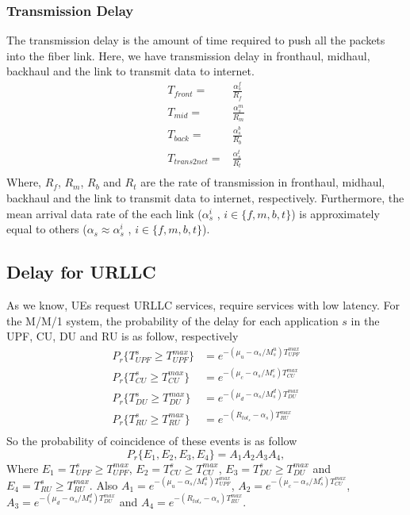 \documentclass[conference]{IEEEtran}
\begin{document}
\subsubsection{Transmission Delay}
The transmission delay is the amount of time required to push all the packets into the fiber link. 
Here, we have transmission delay in fronthaul, midhaul, backhaul and the link to transmit data to internet.
\begin{equation}
\begin{split}
T_{front} =& \frac{\alpha_{s}^{f}}{R_f} \\
T_{mid} =&  \frac{\alpha_{s}^{m}}{R_m} \\
T_{back} =& \frac{\alpha_{s}^{b}}{R_b} \\
T_{trans2net} =& \frac{\alpha_{s}^{t}}{R_t} \\
\end{split}
\end{equation}
Where, $R_f$, $R_m$, $R_b$ and $R_t$ are the rate of transmission in fronthaul, midhaul, backhaul and the link to transmit data to internet, respectively.
Furthermore, the mean arrival data rate of the each link ($\alpha_{s}^i$ , $i \in \{f,m,b,t\}$) is approximately equal to others ($\alpha_{s} \approx \alpha_{s}^i$ , $i \in \{f,m,b,t\}$).  
\subsection{Delay for URLLC}
As we know, UEs request URLLC services, require services with low latency.
For the M/M/1 system, the probability of the delay for each application $s$ in the UPF, CU, DU and RU is as follow, respectively
\begin{equation}
\begin{split}
P_r\{T_{UPF}^{s} \geq T_{UPF}^{max}\} &= e^{-(\mu_u - \alpha_{s}/{M_s^{u}})T_{UPF}^{max}}\\
P_r\{T_{CU}^{s} \geq T_{CU}^{max}\} &= e^{-(\mu_c - \alpha_{s}/{M_s^{c}})T_{CU}^{max}}\\
P_r\{T_{DU}^{s} \geq T_{DU}^{max}\} &= e^{-(\mu_d - \alpha_{s}/{M_s^{d}})T_{DU}^{max}}\\
P_r\{T_{RU}^{s} \geq T_{RU}^{max}\} &= e^{-(R_{{tot}_s} - \alpha_{s})T_{RU}^{max}}\\
\end{split}
\end{equation} 
So the probability of coincidence of these events is as follow
\begin{equation}
P_r\{E_1, E_2, E_3, E_4\} = A_1 A_2 A_3 A_4,
\end{equation}
Where $E_1 = T_{UPF}^{s} \geq T_{UPF}^{max}$, $E_2 =T_{CU}^{s} \geq T_{CU}^{max} $, $E_3 =T_{DU}^{s} \geq T_{DU}^{max} $ and $E_4 =T_{RU}^{s} \geq T_{RU}^{max} $.
Also $A_1=e^{-(\mu_u - \alpha_{s}/{M_s^{u}})T_{UPF}^{max}}$, $A_2=e^{-(\mu_c - \alpha_{s}/{M_s^{c}})T_{CU}^{max}}$, $A_3= e^{-(\mu_d - \alpha_{s}/{M_s^{d}})T_{DU}^{max}}$ and $A_4 = e^{-(R_{{tot}_s} - \alpha_{s})T_{RU}^{max}}$.
\end{document}
